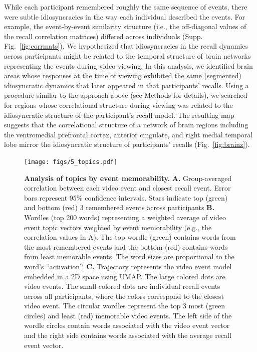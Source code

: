 \documentclass{article}
\begin{document}
While each participant remembered roughly the same sequence of events, there were subtle idiosyncracies in the way each individual described the events. For example, the event-by-event similarity structure (i.e., the off-diagonal values of the recall correlation matrices) differed across individuals (Supp. Fig.~\ref{fig:corrmats}). We hypothesized that idiosyncracies in the recall dynamics across participants might be related to the temporal structure of brain networks representing the events during video viewing. In this analysis, we identified brain areas whose responses at the time of viewing exhibited the same (segmented) idiosyncratic dynamics that later appeared in that participants’ recalls. Using a procedure similar to the approach above (see Methods for details), we searched for regions whose correlational structure during viewing was related to the idiosyncratic structure of the participant's recall model. The resulting map suggests that the correlational structure of a network of brain regions including the ventromedial prefrontal cortex, anterior cingulate, and right medial temporal lobe mirror the idiosyncratic structure of participants' recalls (Fig.~\ref{fig:brainz}).

\begin{figure}[t!]
\centering
\texttt{[image: figs/5\_topics.pdf]}
\caption{\small \textbf{Analysis of topics by event memorability.} \textbf{A.} Group-averaged correlation between each video event and closest recall event. Error bars represent 95\% confidence intervals. Stars indicate top (green) and bottom (red) 3 remembered events across participants \textbf{B.} Wordles (top 200 words) representing a weighted average of video event topic vectors weighted by event memorability (e.g., the correlation values in A). The top wordle (green) contains words from the most remembered events and the bottom (red) contains words from least memorable events. The word sizes are proportional to the word's ``activation''. \textbf{C.} Trajectory represents the video event model embedded in a 2D space using UMAP. The large colored dots are video events. The small colored dots are individual recall events across all participants, where the colors correspond to the closest video event. The circular wordles represent the top 3 most (green circles) and least (red) memorable video events.  The left side of the wordle circles contain words associated with the video event vector and the right side contains words associated with the average recall event vector.}
\label{fig:topics}
\end{figure}
\end{document}
